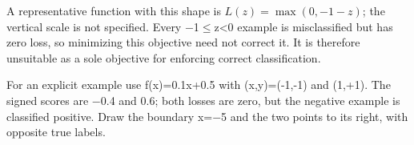 A representative function with this shape is \(L(z)=\max(0,-1-z)\); the vertical scale is not specified. Every \ensuremath{-}1\ensuremath{\le}z<0 example is misclassified but has zero loss, so minimizing this objective need not correct it. It is therefore unsuitable as a sole objective for enforcing correct classification.


For an explicit example use f(x)=0.1x+0.5 with (x,y)=(-1,-1) and (1,+1). The signed scores are \ensuremath{-}0.4 and 0.6; both losses are zero, but the negative example is classified positive. Draw the boundary x=\ensuremath{-}5 and the two points to its right, with opposite true labels.
